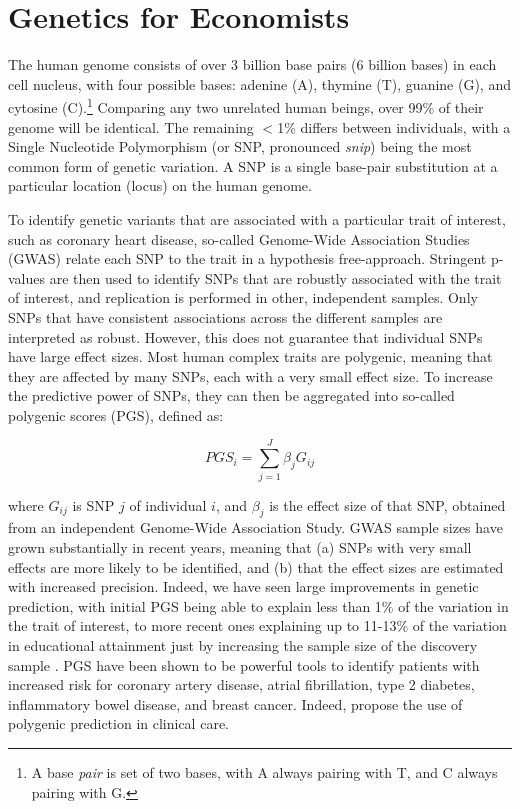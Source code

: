 \tableofcontents


\newpage


\pagebreak
\setcounter{page}{1}

\section{Genetics for Economists}

The human genome consists of over 3 billion base pairs (6 billion bases) in each cell nucleus, with four possible bases: adenine (A), thymine (T), guanine (G), and cytosine (C).\footnote{A base \textit{pair} is set of two bases, with A always pairing with T, and C always pairing with G.} Comparing any two unrelated human beings, over 99\% of their genome will be identical. The remaining $<$1\% differs between individuals, with a Single Nucleotide Polymorphism (or SNP, pronounced \textit{snip}) being the most common form of genetic variation. A SNP is a single base-pair substitution at a particular location (locus) on the human genome.

To identify genetic variants that are associated with a particular trait of interest, such as coronary heart disease, so-called Genome-Wide Association Studies (GWAS) relate each SNP to the trait in a hypothesis free-approach. Stringent p-values are then used to identify SNPs that are robustly associated with the trait of interest, and replication is performed in other, independent samples. Only SNPs that have consistent associations across the different samples are interpreted as robust. However, this does not guarantee that individual SNPs have large effect sizes. Most human complex traits are polygenic, meaning that they are affected by many SNPs, each with a very small effect size. To increase the predictive power of SNPs, they can then be aggregated into so-called polygenic scores (PGS), defined as:

\begin{equation*}
PGS_i = \sum_{j=1}^J \beta_j G_{ij}
\end{equation*}

where $G_{ij}$ is SNP $j$ of individual $i$, and $\beta_j$ is the effect size of that SNP, obtained from an independent Genome-Wide Association Study. GWAS sample sizes have grown substantially in recent years, meaning that (a) SNPs with very small effects are more likely to be identified, and (b) that the effect sizes are estimated with increased precision. Indeed, we have seen large improvements in genetic prediction, with initial PGS being able to explain less than 1\% of the variation in the trait of interest, to more recent ones explaining up to 11-13\% of the variation in educational attainment just by increasing the sample size of the discovery sample \citep[see e.g.,][]{Lee2018}.
PGS have been shown to be powerful tools to identify patients with increased risk for coronary artery disease, atrial fibrillation, type 2 diabetes, inflammatory bowel disease, and breast cancer. Indeed, \cite{Khera2018} propose the use of polygenic prediction in clinical care.


